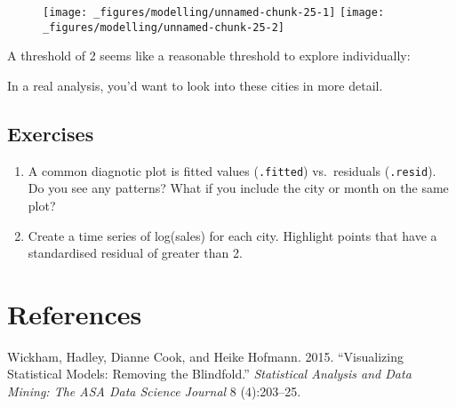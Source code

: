\begin{figure}[H]
  \texttt{[image: \_figures/modelling/unnamed-chunk-25-1]}%
  \texttt{[image: \_figures/modelling/unnamed-chunk-25-2]}
\end{figure}

A threshold of 2 seems like a reasonable threshold to explore
individually:

\begin{Shaded}
\end{Shaded}

In a real analysis, you'd want to look into these cities in more detail.

\hypertarget{exercises-4}{%
\subsection{Exercises}\label{exercises-4}}

\begin{enumerate}
\def\labelenumi{\arabic{enumi}.}
\item
  A common diagnotic plot is fitted values (\texttt{.fitted})
  vs.~residuals (\texttt{.resid}). Do you see any patterns? What if you
  include the city or month on the same plot?
\item
  Create a time series of log(sales) for each city. Highlight points
  that have a standardised residual of greater than 2.
\end{enumerate}

\hypertarget{references}{%
\section*{References}\label{references}}

\hypertarget{refs}{}
\leavevmode\hypertarget{ref-model-vis-paper}{}%
Wickham, Hadley, Dianne Cook, and Heike Hofmann. 2015. ``Visualizing
Statistical Models: Removing the Blindfold.'' \emph{Statistical Analysis
and Data Mining: The ASA Data Science Journal} 8 (4):203--25.
